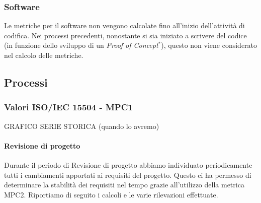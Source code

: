 \subsubsection{Software}
Le metriche per il software non vengono calcolate fino all'inizio dell'attività di codifica. Nei processi precedenti, nonostante si sia iniziato a scrivere del codice (in funzione dello sviluppo di un \textit{Proof of Concept}$^*$), questo non viene considerato nel calcolo delle metriche.

\subsection{Processi}
\subsubsection{Valori ISO/IEC 15504 - MPC1}

GRAFICO SERIE STORICA (quando lo avremo)

\paragraph{Revisione di progetto\\}
Durante il periodo di Revisione di progetto abbiamo individuato periodicamente tutti i cambiamenti apportati ai requisiti del progetto. Questo ci ha permesso di determinare la stabilità dei requisiti nel tempo grazie all'utilizzo della metrica MPC2.
Riportiamo di seguito i calcoli e le varie rilevazioni effettuate.

